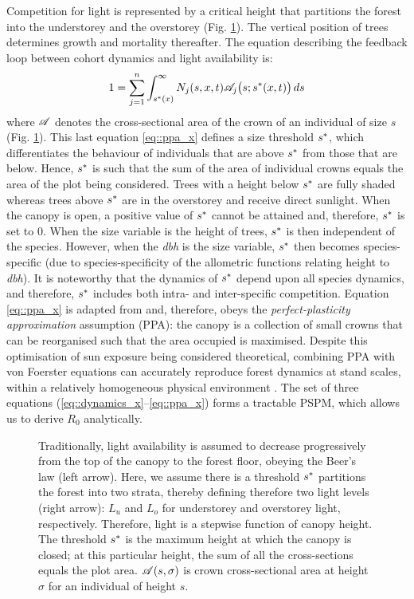 Competition for light is represented by a critical height that partitions the forest into the understorey and the overstorey (Fig. \ref{fig::ppa}). The vertical position of trees determines growth and mortality thereafter. The equation describing the feedback loop between cohort dynamics and light availability is:
\begin{equation}
	1 = \sum_{j = 1}^{n} \int_{{s}^{*}(x)}^{\infty} N_j(s, x, t) \mathscr{A}_j \big(s; {s}^{*}(x, t)\big) \, ds \label{eq::ppa_x}
\end{equation}
where $ \mathscr{A} $ denotes the cross-sectional area of the crown of an individual of size $ s $ (Fig. \ref{fig::ppa}). This last equation \eqref{eq::ppa_x} defines a size threshold $ {s}^{*} $, which differentiates the behaviour of individuals that are above $ {s}^{*} $ from those that are below. Hence, $ {s}^{*} $ is such that the sum of the area of individual crowns equals the area of the plot being considered. Trees with a height below $ {s}^{*} $ are fully shaded whereas trees above $ {s}^{*} $ are in the overstorey and receive direct sunlight. When the canopy is open, a positive value of $ {s}^{*} $ cannot be attained and, therefore, $ {s}^{*} $ is set to $ 0 $. When the size variable is the height of trees, $ {s}^{*} $ is then independent of the species. However, when the \textit{dbh} is the size variable, $ {s}^{*} $ then becomes species-specific (due to species-specificity of the allometric functions relating height to \textit{dbh}). It is noteworthy that the dynamics of $ {s}^{*} $ depend upon all species dynamics, and therefore, $ {s}^{*} $ includes both intra- and inter-specific competition. Equation \eqref{eq::ppa_x} is adapted from \citet{Strigul2008} and, therefore, obeys the \textit{perfect-plasticity approximation} assumption (PPA): the canopy is a collection of small crowns that can be reorganised such that the area occupied is maximised. Despite this optimisation of sun exposure being considered theoretical, combining PPA with von Foerster equations can accurately reproduce forest dynamics at stand scales, within a relatively homogeneous physical environment \citep{Strigul2008, Purves2008}. The set of three equations (\ref{eq::dynamics_x}--\ref{eq::ppa_x}) forms a tractable PSPM, which allows us to derive $ R_0 $ analytically.

\begin{figure}
	\centering
	
	\caption{Traditionally, light availability is assumed to decrease progressively from the top of the canopy to the forest floor, obeying the Beer's law (left arrow). Here, we assume there is a threshold $ {s}^{*} $ partitions the forest into two strata, thereby defining therefore two light levels (right arrow): $ L_u $ and $ L_o $ for understorey and overstorey light, respectively. Therefore, light is a stepwise function of canopy height. The threshold $ {s}^{*} $ is the maximum height at which the canopy is closed; at this particular height, the sum of all the cross-sections equals the plot area. $ \mathscr{A}(s, \sigma) $ is crown cross-sectional area at height $ \sigma $ for an individual of height $ s $. \label{fig::ppa}}
\end{figure}


